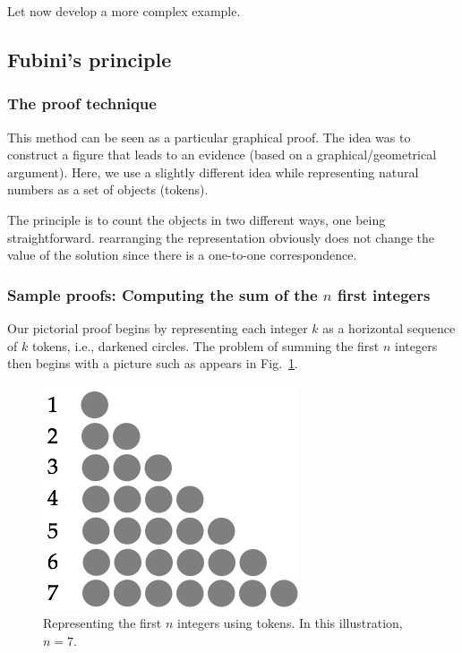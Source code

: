 Let now develop a more complex example.



\subsection{Fubini's principle}
\label{sec:Fubini}


\subsubsection{The proof technique}

This method can be seen as a particular graphical proof.
The idea was to construct a figure that leads to an evidence (based on a graphical/geometrical argument).
Here, we use a slightly different idea while representing natural numbers as a set of objects (tokens).

The principle is to count the objects in two different ways, one being straightforward.
rearranging the representation obviously does not change the value of the solution
since there is a one-to-one correspondence.


\subsubsection{Sample proofs: Computing the sum of the $n$ first integers}


Our pictorial proof begins by representing each integer $k$ as a
horizontal sequence of $k$ tokens, i.e., darkened circles.  The
problem of summing the first $n$ integers then begins with a
picture such as appears in Fig.~\ref{fig:sumIntegers1}.

\begin{figure}[ht]
\begin{center}
       \includegraphics[scale=0.4]{FiguresMaths/SumIntegersBasis}
\caption{Representing the first $n$ integers using tokens.  In
  this illustration, $n=7$.}
       \label{fig:sumIntegers1}
\end{center}
\end{figure}


